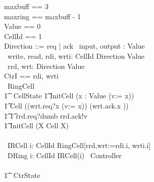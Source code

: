 \documentclass[10pt]{article}
\begin{document}
\begin{circus}

maxbuff == 3 \\
maxring == maxbuff - 1 \\
Value == 0  \\
CellId == 1  \\
Direction ::=  req | ack
\also \circchannel\ input, output : Value \\
\circchannel\ write, read, rdi, wrti: CellId \cross Direction \cross Value \\
\circchannel\ rrd, wrt: Direction \cross Value \\
\circchannelset CtrI == \lchanset rdi, wrti \rchanset \\

\circprocess\ RingCell \circdef\\
\circbegin
\t1 \circstate\ CellState 
\t1 InitCell \circdef (\Intchoice x : Value \circspot (v:= x)) \\
\t1 Cell \circdef ((wrt.req?x \then (v:= x)) \circseq (wrt.ack.x \then \Skip))  \\
\t1 \t1         \extchoice rrd.req?dumb \then rrd.ack!v \then \Skip \\
\t1 \circspot InitCell \circseq (\circmu X \circspot Cell \circseq X)
\\
\circend
\\
\circprocess\ IRCell \circdef i: CellId \circspot RingCell[rrd,wrt:=rdi.i, wrti.i]
\\
\circprocess\ DRing \circdef \Interleave i: CellId \circspot IRCell(i)
\also
\circprocess\ Controller \circdef \\
\circbegin\\
\t1 \circstate\ CtrState  \\


\end{circus}
\end{document}
